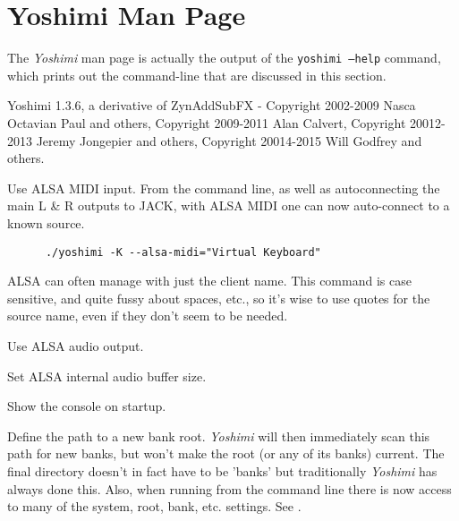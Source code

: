 %
%
%

\section{Yoshimi Man Page}
\label{sec:yoshimi_man_page}

   The \textsl{Yoshimi} man page is actually the output of the
   \texttt{yoshimi --help} command, which prints out the command-line that
   are discussed in this section.

Yoshimi 1.3.6, a derivative of ZynAddSubFX - Copyright 2002-2009
Nasca Octavian Paul and others, Copyright 2009-2011 Alan Calvert,
Copyright 20012-2013 Jeremy Jongepier and others,
Copyright 20014-2015 Will Godfrey and others.

   \setcounter{ItemCounter}{0}      %

      Use ALSA MIDI input.
      From the command line, as well as autoconnecting the main L \& R
      outputs to JACK, with ALSA MIDI one can now auto-connect to a known source.

   \begin{verbatim}
      ./yoshimi -K --alsa-midi="Virtual Keyboard"
   \end{verbatim}

      ALSA can often manage with just the client name.  This command is case
      sensitive, and quite fussy about spaces, etc., so it's wise to use
      quotes for the source name, even if they don't seem to be needed.

      Use ALSA audio output.

      Set ALSA internal audio buffer size.

      Show the console on startup.

      Define the path to a new bank root.
      \textsl{Yoshimi} will then immediately scan this path for new banks,
      but won't make the root (or any of its banks) current. The final
      directory doesn't in fact have to be 'banks' but traditionally
      \textsl{Yoshimi} has always done this.
      Also, when running from the command line there is now access to many of
      the system, root, bank, etc. settings.
      See .

